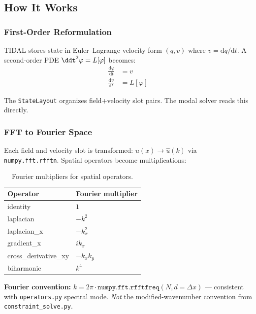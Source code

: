 \subsection{How It Works}
\label{sec:modal-how}

\subsubsection{First-Order Reformulation}
\label{sec:modal-first-order}

TIDAL stores state in Euler--Lagrange velocity form $(q, v)$ where $v = \mathrm{d}q/\mathrm{d}t$. A second-order PDE $\ddt^2 \varphi = L[\varphi]$ becomes:
\begin{align}
  \frac{\mathrm{d}\varphi}{\mathrm{d}t} &= v \\
  \frac{\mathrm{d}v}{\mathrm{d}t} &= L[\varphi]
\end{align}

The \texttt{StateLayout} organizes field+velocity slot pairs. The modal solver reads this directly.

\subsubsection{FFT to Fourier Space}
\label{sec:modal-fft}

Each field and velocity slot is transformed: $u(x) \to \hat{u}(k)$ via \texttt{numpy.fft.rfftn}. Spatial operators become multiplications:

\begin{table}[htbp]
\centering
\caption{Fourier multipliers for spatial operators.}
\label{tab:fourier-multipliers}
\begin{tabular}{@{}ll@{}}
\toprule
Operator & Fourier multiplier \\
\midrule
identity & $1$ \\
laplacian & $-k^2$ \\
laplacian\_x & $-k_x^2$ \\
gradient\_x & $ik_x$ \\
cross\_derivative\_xy & $-k_x k_y$ \\
biharmonic & $k^4$ \\
\bottomrule
\end{tabular}
\end{table}

\textbf{Fourier convention:} $k = 2\pi \cdot \texttt{numpy.fft.rfftfreq}(N, d=\Delta x)$ --- consistent with \texttt{operators.py} spectral mode. \emph{Not} the modified-wavenumber convention from \texttt{constraint\_solve.py}.


